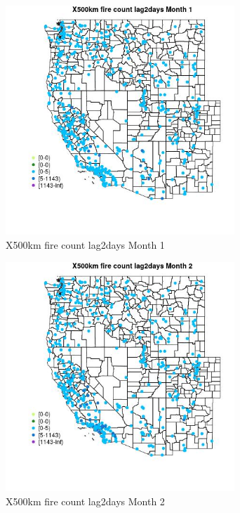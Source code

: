 \begin{figure} 
\centering  
\includegraphics[width=0.77\textwidth]{Code_Outputs/Report_ML_input_PM25_Step4_part_e_de_duplicated_aves_compiled_2019-05-14wNAs_MapObsMo1X500km_fire_count_lag2days.jpg} 
\caption{\label{fig:Report_ML_input_PM25_Step4_part_e_de_duplicated_aves_compiled_2019-05-14wNAsMapObsMo1X500km_fire_count_lag2days}X500km fire count lag2days Month 1} 
\end{figure} 
 

\begin{figure} 
\centering  
\includegraphics[width=0.77\textwidth]{Code_Outputs/Report_ML_input_PM25_Step4_part_e_de_duplicated_aves_compiled_2019-05-14wNAs_MapObsMo2X500km_fire_count_lag2days.jpg} 
\caption{\label{fig:Report_ML_input_PM25_Step4_part_e_de_duplicated_aves_compiled_2019-05-14wNAsMapObsMo2X500km_fire_count_lag2days}X500km fire count lag2days Month 2} 
\end{figure} 
 

